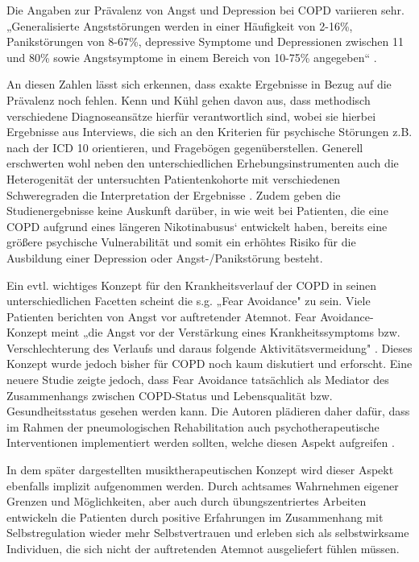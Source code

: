 Die Angaben zur Prävalenz von Angst und Depression bei COPD variieren sehr. „Generalisierte Angststörungen werden in einer Häufigkeit von 2-16\%, Panikstörungen von 8-67\%, depressive Symptome und Depressionen zwischen 11 und 80\% sowie Angstsymptome in einem Bereich von 10-75\% angegeben“  \autocite[34]{kenn2011}.

An diesen Zahlen lässt sich erkennen, dass exakte Ergebnisse in Bezug auf die Prävalenz noch fehlen. Kenn und Kühl gehen davon aus, dass methodisch verschiedene Diagnoseansätze hierfür verantwortlich sind, wobei sie hierbei Ergebnisse aus Interviews, die sich an den Kriterien für psychische Störungen z.B. nach der ICD 10 orientieren, und Fragebögen gegenüberstellen. Generell erschwerten wohl neben den unterschiedlichen Erhebungsinstrumenten auch die Heterogenität der untersuchten Patientenkohorte mit verschiedenen Schweregraden die Interpretation der Ergebnisse \autocite[vgl.][35]{kenn2011}.
Zudem geben die Studienergebnisse keine Auskunft darüber, in wie weit bei Patienten, die eine COPD aufgrund eines längeren Nikotinabusus‘ entwickelt haben, bereits eine größere psychische Vulnerabilität und somit ein erhöhtes Risiko für die Ausbildung einer Depression oder Angst-/Panikstörung besteht. 

Ein evtl. wichtiges Konzept für den Krankheitsverlauf der COPD in seinen unterschiedlichen Facetten scheint die s.g. „Fear Avoidance" zu sein. Viele Patienten berichten von Angst vor auftretender Atemnot. Fear Avoidance- Konzept meint „die Angst vor der Verstärkung eines Krankheitssymptoms bzw. Verschlechterung des Verlaufs und daraus folgende Aktivitätsvermeidung" \autocite[111]{stenzel2013}. Dieses Konzept wurde jedoch bisher für COPD noch kaum diskutiert und erforscht. Eine neuere Studie zeigte jedoch, dass Fear Avoidance tatsächlich als Mediator des Zusammenhangs zwischen COPD-Status und Lebensqualität bzw. Gesundheitsstatus gesehen werden kann. Die Autoren plädieren daher dafür, dass im Rahmen der pneumologischen Rehabilitation auch psychotherapeutische Interventionen implementiert werden sollten, welche diesen Aspekt aufgreifen \autocite[112]{stenzel2013}. 

In dem später dargestellten musiktherapeutischen Konzept wird dieser Aspekt ebenfalls implizit aufgenommen werden. Durch achtsames Wahrnehmen eigener Grenzen und Möglichkeiten, aber auch durch übungszentriertes Arbeiten entwickeln die Patienten durch positive Erfahrungen im Zusammenhang mit Selbstregulation wieder mehr Selbstvertrauen und erleben sich als selbstwirksame Individuen, die sich nicht der auftretenden Atemnot ausgeliefert fühlen müssen.

